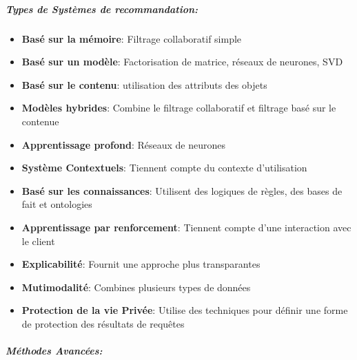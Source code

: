 \documentclass{article}
\begin{document}
    \subparagraph{Types de Systèmes de recommandation:}
    \begin{itemize}
        \item \textbf{Basé sur la mémoire}: Filtrage collaboratif simple
        \item \textbf{Basé sur un modèle}: Factorisation de matrice, réseaux de neurones, SVD
        \item \textbf{Basé sur le contenu}: utilisation des attributs des objets
        \item \textbf{Modèles hybrides}: Combine le filtrage collaboratif et filtrage basé sur le contenue
        \item \textbf{Apprentissage profond}: Réseaux de neurones
        \item \textbf{Système Contextuels}: Tiennent compte du contexte d'utilisation
        \item \textbf{Basé sur les connaissances}: Utilisent des logiques de règles, des bases de fait et ontologies
        \item \textbf{Apprentissage par renforcement}: Tiennent compte d'une interaction avec le client
        \item \textbf{Explicabilité}: Fournit une approche plus transparantes
        \item \textbf{Mutimodalité}: Combines plusieurs types de données
        \item \textbf{Protection de la vie Privée}: Utilise des techniques pour définir une forme de protection des résultats de requêtes
    \end{itemize}

    \subparagraph{Méthodes Avancées: }
\end{document}

